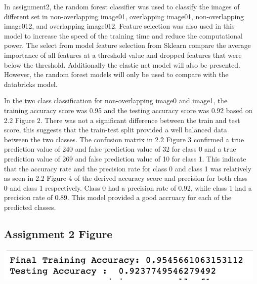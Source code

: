 \documentclass[12pt]{article}
\begin{document}
\begin{multicols*}{2}
  \hspace*{5mm} In assignment2, the random forest classifier was used to classify the images of different set in non-overlapping image01, 
  overlapping image01, non-overlapping image012, and overlapping image012. Feature selection was also used in this model to increase
  the speed of the training time and reduce the computational power. The select from model feature selection from Sklearn compare the average
  importance of all features at a threshold value and dropped features that were below the threshold. Additionally the elastic net model will also be presented. However, the random forest models
  will only be used to compare with the databricks model. 

  \hspace*{5mm} In the two class classification for non-overlapping image0 and image1, the training accuracy score was 0.95 and the testing 
  accuracy score was 0.92 based on 2.2 Figure 2. There was not a significant difference between the train and test score, this suggests that the train-test split 
  provided a well balanced data between the two classes. The confusion matrix in 2.2 Figure 3 confirmed a true prediction value of 240 and false prediction value of 
  32 for class 0 and a true prediction value of 269 and false prediction value of 10 for class 1. This indicate that the accuracy rate and the precision
  rate for class 0 and class 1 was relatively as seen in 2.2 Figure 4 of the derived accuracy score and precision for both class 0 and class 1 respectively.
  Class 0 had a precision rate of 0.92, while class 1 had a precision rate of 0.89. This model provided a good accruacy for each of the predicted classes.

  \subsection{Assignment 2 Figure} 
  \begin{center}
		\includegraphics[scale=0.5]{../screenshot/Rf-Non-Overlapping01/score.png}


\end{center}
\end{multicols*}
\end{document}
